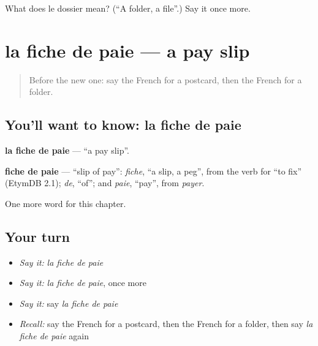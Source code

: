 \begin{tcolorbox}[breakable,colback=teal!4,colframe=teal!35!black,title={Before you move on}]
What does le dossier mean? (\textquotedblleft{}A folder, a file\textquotedblright{}.) Say it once more.
\end{tcolorbox}
\section[la fiche de paie]{la fiche de paie — a pay slip}

\label{lesson:FR-C169-fiche-de-paie}



\begin{quote}
Before the new one: say the French for a postcard, then the French for a folder.
\end{quote}

\subsection*{You'll want to know: la fiche de paie}
\textbf{la fiche de paie} — \textquotedblleft{}a pay slip\textquotedblright{}.

\begin{cousinweb}
\textbf{fiche de paie} — \textquotedblleft{}slip of pay\textquotedblright{}: \emph{fiche}, \textquotedblleft{}a slip, a peg\textquotedblright{}, from the verb for \textquotedblleft{}to fix\textquotedblright{} (EtymDB 2.1); \emph{de}, \textquotedblleft{}of\textquotedblright{}; and \emph{paie}, \textquotedblleft{}pay\textquotedblright{}, from \emph{payer}.
\end{cousinweb}

\begin{grammarlens}[title={What you've built}]
One more word for this chapter.
\end{grammarlens}

\subsection*{Your turn}
\begin{itemize}
\raggedright
  \item \emph{Say it:} \emph{la fiche de paie}
  \item \emph{Say it:} \emph{la fiche de paie}, once more
  \item \emph{Say it:} say \emph{la fiche de paie}
  \item \emph{Recall:} say the French for a postcard, then the French for a folder, then say \emph{la fiche de paie} again
\end{itemize}

